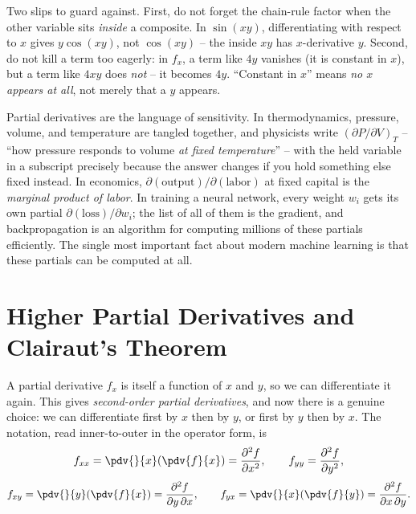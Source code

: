 \begin{trapbox}
Two slips to guard against. First, do not forget the chain-rule factor when the other variable
sits \emph{inside} a composite. In $\sin(xy)$, differentiating with respect to $x$ gives
$y\cos(xy)$, not $\cos(xy)$ -- the inside $xy$ has $x$-derivative $y$. Second, do not kill a
term too eagerly: in $f_x$, a term like $4y$ vanishes (it is constant in $x$), but a term like
$4xy$ does \emph{not} -- it becomes $4y$. ``Constant in $x$'' means \emph{no $x$ appears at
all}, not merely that a $y$ appears.
\end{trapbox}

\begin{applicationbox}
Partial derivatives are the language of sensitivity. In thermodynamics, pressure, volume, and
temperature are tangled together, and physicists write $\left(\partial P/\partial V\right)_T$
-- ``how pressure responds to volume \emph{at fixed temperature}'' -- with the held variable in
a subscript precisely because the answer changes if you hold something else fixed instead. In
economics, $\partial(\text{output})/\partial(\text{labor})$ at fixed capital is the
\emph{marginal product of labor}. In training a neural network, every weight $w_i$ gets its own
partial $\partial(\text{loss})/\partial w_i$; the list of all of them is the gradient, and
backpropagation is an algorithm for computing millions of these partials efficiently. The
single most important fact about modern machine learning is that these partials can be computed
at all.
\end{applicationbox}

\section{Higher Partial Derivatives and Clairaut's Theorem}
\label{ch32:sec-higher}

A partial derivative $f_x$ is itself a function of $x$ and $y$, so we can differentiate it
again. This gives \emph{second-order partial derivatives}, and now there is a genuine choice:
we can differentiate first by $x$ then by $y$, or first by $y$ then by $x$. The notation, read
inner-to-outer in the operator form, is
\[
   f_{xx} = \pdv{}{x}\!\left(\pdv{f}{x}\right) = \frac{\partial^2 f}{\partial x^2},
   \qquad
   f_{yy} = \frac{\partial^2 f}{\partial y^2},
\]
\[
   f_{xy} = \pdv{}{y}\!\left(\pdv{f}{x}\right) = \frac{\partial^2 f}{\partial y\,\partial x},
   \qquad
   f_{yx} = \pdv{}{x}\!\left(\pdv{f}{y}\right) = \frac{\partial^2 f}{\partial x\,\partial y}.
\]

